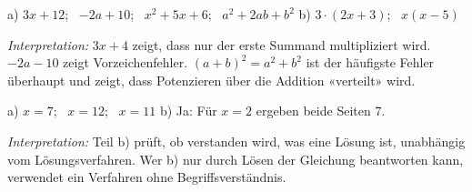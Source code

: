 \documentclass[11pt]{exam}
\newcommand{\aufgabe}[1]{%
  \needspace{8\baselineskip}%
  \renewcommand{\questionlabel}{\textbf{#1}}%
  \question}
\newcommand{\raum}[1]{\ifprintanswers\else\fillwithgrid{#1}\fi}
\newcommand{\diagnose}[1]{\par\smallskip\textit{Interpretation:} #1}
\begin{document}
\begin{questions}
\aufgabe{5.5}
\begin{solution}
  a) $3x + 12$; \ $-2a + 10$; \ $x^2 + 5x + 6$; \ $a^2 + 2ab + b^2$ \quad
  b) $3 \cdot (2x + 3)$; \ $x(x - 5)$
  \diagnose{$3x + 4$ zeigt, dass nur der erste Summand multipliziert wird.
  $-2a - 10$ zeigt Vorzeichenfehler. $(a + b)^2 = a^2 + b^2$ ist der häufigste
  Fehler überhaupt und zeigt, dass Potenzieren über die Addition «verteilt»
  wird.}
\end{solution}
\raum{4cm}

\aufgabe{6.5}
\begin{solution}
  a) $x = 7$; \ $x = 12$; \ $x = 11$ \qquad
  b) Ja: Für $x = 2$ ergeben beide Seiten $7$.
  \diagnose{Teil b) prüft, ob verstanden wird, was eine Lösung ist, unabhängig
  vom Lösungsverfahren. Wer b) nur durch Lösen der Gleichung beantworten kann,
  verwendet ein Verfahren ohne Begriffsverständnis.}
\end{solution}
\raum{4.5cm}


\end{questions}
\end{document}
